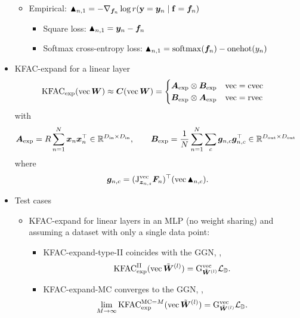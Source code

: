 \begin{itemize}
\begin{itemize}
    \item Empirical: $\blacktriangle_{n,1} = - \nabla_{{\bm{f}}_n} \log r({\mathbf{y}} = {\bm{y}}_n \mid {\mathbf{f}} = {\bm{f}}_n)$
      \begin{itemize}
      \item Square loss: $\blacktriangle_{n,1} = {\bm{y}}_n - {\bm{f}}_n$
      \item Softmax cross-entropy loss: $\blacktriangle_{n,1} = \mathrm{softmax}({\bm{f}}_n) - \mathrm{onehot}(y_n)$
      \end{itemize}
    \end{itemize}
  \item KFAC-expand for a linear layer
    \begin{align*}
      &\mathrm{KFAC}_{\text{exp}}(\operatorname{vec} {\bm{W}}) \approx {\bm{C}}(\operatorname{vec} {\bm{W}})
      =
        \begin{cases}
          {\bm{A}}_{\text{exp}} \otimes {\bm{B}}_{\text{exp}} & \operatorname{vec} = \operatorname{cvec}
          \\
          {\bm{B}}_{\text{exp}} \otimes {\bm{A}}_{\text{exp}} & \operatorname{vec} = \operatorname{rvec}
        \end{cases}\,
    \end{align*}
    with
    \begin{align*}
      {\bm{A}}_{\text{exp}} = R \sum_{n=1}^N {\bm{x}}_{n} {\bm{x}}_{n}^{\top} \in {\mathbb{R}}^{D_{\text{in}} \times D_{\text{in}}}, \qquad
      {\bm{B}}_{\text{exp}} &= \frac{1}{N}\sum_{n=1}^N \sum_c {\bm{g}}_{n,c} {\bm{g}}_{n,c}^{\top}  \in {\mathbb{R}}^{D_{\text{out}} \times D_{\text{out}}}
    \end{align*}
    where
    \begin{align*}
    {\bm{g}}_{n,c} = (\mathrm{J}_{{\bm{z}}_{n,s}}^{\operatorname{vec}}{\bm{F}}_n)^{\top} (\operatorname{vec} \blacktriangle_{n,c}).
    \end{align*}
  \item Test cases
    \begin{itemize}
      \item KFAC-expand for linear layers in an MLP (no weight sharing) and assuming a dataset with only a single data point:
        \begin{itemize}
          \item KFAC-expand-type-II coincides with the GGN, \ie,
            \begin{align*}
              \mathrm{KFAC}^{\text{II}}_{\text{exp}}(\operatorname{vec}\tilde{{\bm{W}}}^{(l)}) = \mathrm{G}^{\operatorname{vec}}_{\tilde{{\bm{W}}}^{(l)}}{\mathcal{L}}_{{\mathbb{D}}}.
            \end{align*}
          \item KFAC-expand-MC converges to the GGN, \ie,
            \begin{align*}
              \lim_{M \to \infty} \kfac^{\text{MC}=M}_{\text{exp}}(\vec\tilde{\mW}^{(l)}) = \ggn^{\vec}_{\tilde{\mW}^{(l)}}\gL_{\sD}.

\end{align*}
\end{itemize}
\end{itemize}
\end{itemize}
